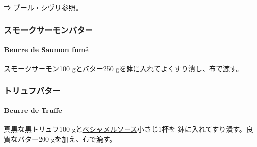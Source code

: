 \begin{recette}
⇒ \protect\hyperlink{beurre-chivry}{ブール・シヴリ}参照。

\maeaki

\hypertarget{ux30b9ux30e2ux30fcux30afux30b5ux30fcux30e2ux30f3ux30d0ux30bfux30fc}{%
\subsubsection{スモークサーモンバター}\label{ux30b9ux30e2ux30fcux30afux30b5ux30fcux30e2ux30f3ux30d0ux30bfux30fc}}

\hypertarget{beurre-de-saumon-fume}{%
\paragraph{Beurre de Saumon fumé}\label{beurre-de-saumon-fume}}


スモークサーモン100 gとバター250 gを鉢に入れてよくすり潰し、布で漉す。

\maeaki

\hypertarget{ux30c8ux30eaux30e5ux30d5ux30d0ux30bfux30fc}{%
\subsubsection{トリュフバター}\label{ux30c8ux30eaux30e5ux30d5ux30d0ux30bfux30fc}}

\hypertarget{beurre-de-truffe}{%
\paragraph{Beurre de Truffe}\label{beurre-de-truffe}}


真黒な黒トリュフ100
gと\protect\hyperlink{sauce-bechamel}{ベシャメルソース}小さじ1杯を
鉢に入れてすり潰す。良質なバター200 gを加え、布で漉す。

\maeaki


\end{recette}
